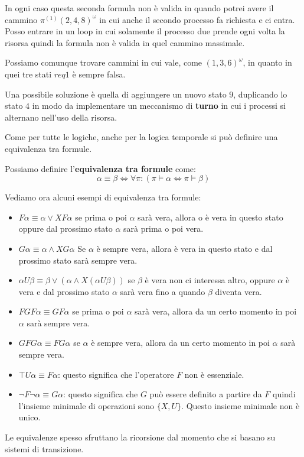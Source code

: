 \begin{esempio}
    In ogni caso questa seconda formula non è valida in quando potrei avere il
    cammino $\pi^{(1)}(2,4,8)^\omega$ in cui anche il secondo processo fa
    richiesta e ci entra. Posso entrare in un loop in cui solamente il processo
    due prende ogni volta la risorsa quindi la formula non è valida in quel
    cammino massimale.

    Possiamo comunque trovare cammini in cui vale, come $(1,3,6)^\omega$, in
    quanto in quei tre stati $req1$ è sempre falsa.

    Una possibile soluzione è quella di aggiungere un nuovo stato $9$, duplicando
    lo stato $4$ in modo da implementare un meccanismo di \textbf{turno} in cui
    i processi si alternano nell'uso della risorsa.
\end{esempio}
Come per tutte le logiche, anche per la logica temporale si può definire una
equivalenza tra formule.
\begin{definizione}
    Possiamo definire l'\textbf{equivalenza tra formule} come:
    \begin{equation}
        \alpha \equiv \beta \iff \forall \pi: ( \pi \vDash \alpha \iff
        \pi \vDash \beta)
    \end{equation}
\end{definizione}
\begin{esempio}
    Vediamo ora alcuni esempi di equivalenza tra formule:
    \begin{itemize}
        \item $F\alpha \equiv \alpha \lor XF\alpha$ se prima o poi $\alpha$ sarà
              vera, allora o è vera in questo stato oppure dal prossimo stato
              $\alpha$ sarà prima o poi vera.
        \item $G\alpha \equiv \alpha \land XG\alpha$ Se $\alpha$  è sempre vera,
              allora è vera in questo stato e dal prossimo stato sarà sempre vera.
        \item $\alpha U \beta \equiv \beta \lor (\alpha \land X(\alpha U \beta))$
              se $\beta$ è vera non ci interessa altro, oppure $\alpha$ è vera e
              dal prossimo stato $\alpha$ sarà vera fino a quando $\beta$ diventa
              vera.
        \item $FGF \alpha \equiv GF\alpha$ se prima o poi $\alpha$ sarà vera,
              allora da un certo momento in poi $\alpha$ sarà sempre vera.
        \item $GFG\alpha \equiv FG\alpha$ se $\alpha$ è sempre vera, allora da un
              certo momento in poi $\alpha$ sarà sempre vera.
        \item $\top U\alpha \equiv F\alpha$: questo significa che l'operatore
              $F$ non è essenziale.
        \item $\lnot F \lnot \alpha \equiv G \alpha$: questo significa che $G$
              può essere definito a partire da $F$ quindi l'insieme minimale di
              operazioni sono $\{X,U\}$. Questo insieme minimale non è unico.
    \end{itemize}
\end{esempio}
Le equivalenze spesso sfruttano la ricorsione dal momento che si basano su sistemi
di transizione.

